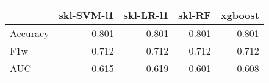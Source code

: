 \begin{tabular}{lrrrr}
\toprule
{} &  skl-SVM-l1 &  skl-LR-l1 &  skl-RF &  xgboost \\
\midrule
Accuracy &       0.801 &      0.801 &   0.801 &    0.801 \\
F1w      &       0.712 &      0.712 &   0.712 &    0.712 \\
AUC      &       0.615 &      0.619 &   0.601 &    0.608 \\
\bottomrule
\end{tabular}
